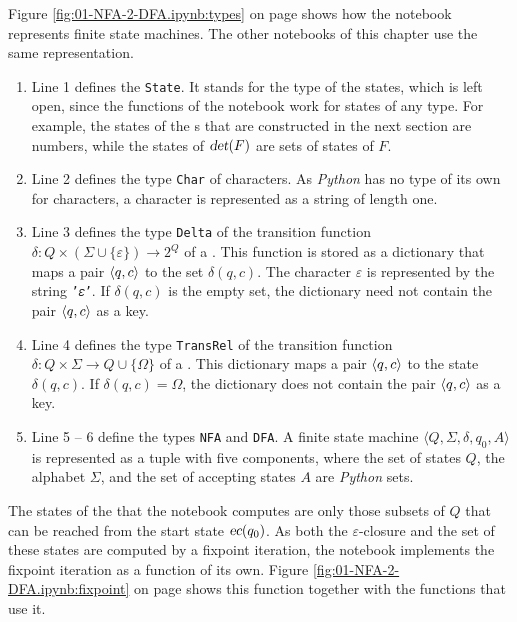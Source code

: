 \noindent
Figure \ref{fig:01-NFA-2-DFA.ipynb:types} on page \pageref{fig:01-NFA-2-DFA.ipynb:types} shows how the notebook
represents finite state machines.  The other notebooks of this chapter use the same representation.
\begin{enumerate}
\item Line 1 defines the  \texttt{State}.  It stands for the type of the
      states, which is left open, since the functions of the notebook work for states of any type.  For example,
      the states of the s that are constructed in the next section are numbers, while the states of
      $\textsl{det}(F)$ are sets of states of $F$.
\item Line 2 defines the type \texttt{Char} of characters.  As \textsl{Python} has no type of its own for
      characters, a character is represented as a string of length one.
\item Line 3 defines the type \texttt{Delta} of the transition function
      $\delta: Q \times (\Sigma \cup \{\varepsilon\}) \rightarrow 2^Q$ of a .  This function is
      stored as a dictionary that maps a pair $\pair(q, c)$ to the set $\delta(q, c)$.  The character
      $\varepsilon$ is represented by the string \texttt{'𝜀'}.  If $\delta(q, c)$ is the empty set, the
      dictionary need not contain the pair $\pair(q, c)$ as a key.
\item Line 4 defines the type \texttt{TransRel} of the transition function
      $\delta: Q \times \Sigma \rightarrow Q \cup \{\Omega\}$ of a .  This dictionary maps a pair
      $\pair(q, c)$ to the state $\delta(q, c)$.  If $\delta(q, c) = \Omega$, the dictionary does not contain the
      pair $\pair(q, c)$ as a key.
\item Line 5 -- 6 define the types \texttt{NFA} and \texttt{DFA}.  A finite state machine
      $\langle Q, \Sigma, \delta, q_0, A \rangle$ is represented as a tuple with five components, where the set of
      states $Q$, the alphabet $\Sigma$, and the set of accepting states $A$ are \textsl{Python} sets.
\end{enumerate}
The states of the  that the notebook computes are only those subsets of $Q$ that can be reached
from the start state $\textsl{ec}(q_0)$.  As both the $\varepsilon$-closure and the set of these states are
computed by a fixpoint iteration, the notebook implements the fixpoint iteration as a function of its own.  Figure
\ref{fig:01-NFA-2-DFA.ipynb:fixpoint} on page \pageref{fig:01-NFA-2-DFA.ipynb:fixpoint} shows this function
together with the functions that use it.

